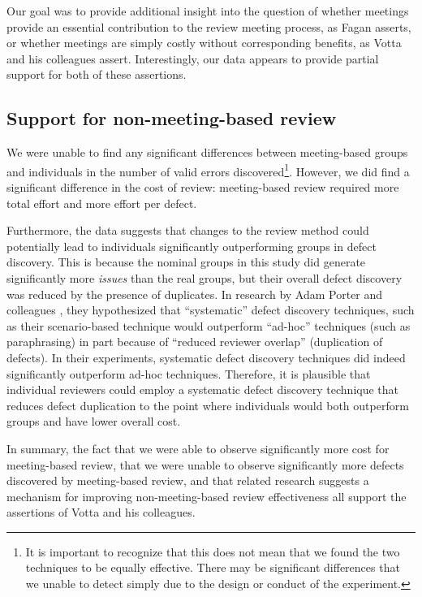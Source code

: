 Our goal was to provide additional insight into the question of whether
meetings provide an essential contribution to the review meeting process,
as Fagan asserts, or whether meetings are simply costly without
corresponding benefits, as Votta and his colleagues assert.  Interestingly,
our data appears to provide partial support for both of these assertions.

\subsection{Support for non-meeting-based review}

We were unable to find any significant differences between meeting-based
groups and individuals in the number of valid errors discovered\footnote{It
  is important to recognize that this does not mean that we found the two
  techniques to be equally effective. There may be significant differences
  that we unable to detect simply due to the design or conduct of the
  experiment.}. However, we did find a significant difference in the cost of
review: meeting-based review required more total effort and more effort per
defect.

Furthermore, the data suggests that changes to the review method could
potentially lead to individuals significantly outperforming groups in
defect discovery.  This is because the nominal groups in this study did
generate significantly more {\em issues} than the real groups, but their overall
defect discovery was reduced by the presence of duplicates.  In research by
Adam Porter and colleagues \cite{Porter95}, they hypothesized that
``systematic'' defect discovery techniques, such as their scenario-based
technique would outperform ``ad-hoc'' techniques (such as paraphrasing) in
part because of ``reduced reviewer overlap'' (duplication of defects). In
their experiments, systematic defect discovery techniques did indeed
significantly outperform ad-hoc techniques.  Therefore, it is plausible
that individual reviewers could employ a systematic defect discovery
technique that reduces defect duplication to the point where individuals
would both outperform groups and have lower overall cost. 

In summary, the fact that we were able to observe significantly more cost for
meeting-based review, that we were unable to observe significantly more
defects discovered by meeting-based review, and that related research
suggests a mechanism for improving non-meeting-based review effectiveness
all support the assertions of Votta and his colleagues.

